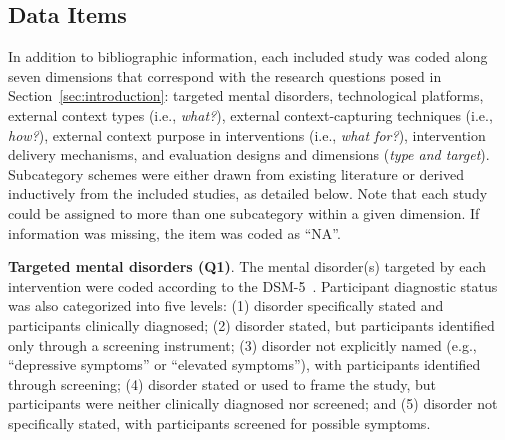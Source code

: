 \subsection{Data Items}
\label{sec:methods:data-items}

In addition to bibliographic information, each included study was coded along seven dimensions that correspond with the research questions posed in Section~\ref{sec:introduction}: targeted mental disorders, technological platforms, external context types (i.e., \textit{what?}), external context-capturing techniques (i.e., \textit{how?}), external context purpose in interventions (i.e., \textit{what for?}), intervention delivery mechanisms, and evaluation designs and dimensions (\textit{type and target}). Subcategory schemes were either drawn from existing literature or derived inductively from the included studies, as detailed below. Note that each study could be assigned to more than one subcategory within a given dimension. If information was missing, the item was coded as ``NA''.

\textbf{Targeted mental disorders (Q1)}. The mental disorder(s) targeted by each intervention were coded according to the DSM-5~\cite{APA2022DSM5TR}. Participant diagnostic status was also categorized into five levels: (1) disorder specifically stated and participants clinically diagnosed; (2) disorder stated, but participants identified only through a screening instrument; (3) disorder not explicitly named (e.g., ``depressive symptoms'' or ``elevated symptoms''), with participants identified through screening; (4) disorder stated or used to frame the study, but participants were neither clinically diagnosed nor screened; and (5) disorder not specifically stated, with participants screened for possible symptoms.



